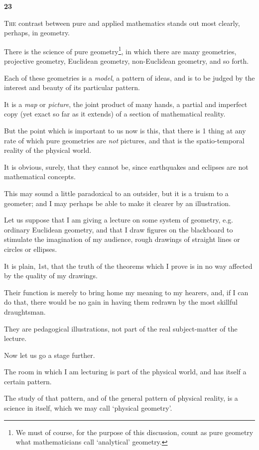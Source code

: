 \documentclass{article}
\numberwithin{equation}{section}
\begin{document}
\begin{center}
    \large\textbf{23}
\end{center}
\textsc{The} contrast between pure and applied mathematics stands out most clearly, perhaps, in geometry.

There is the science of pure geometry\footnote{We must of course, for the purpose of this discussion, count as pure geometry what mathematicians call `analytical' geometry.}, in which there are many geometries, projective geometry, Euclidean geometry, non-Euclidean geometry, and so forth.

Each of these geometries is a \textit{model}, a pattern of ideas, and is to be judged by the interest and beauty of its particular pattern.

It is a \textit{map} or \textit{picture}, the joint product of many hands, a partial and imperfect copy (yet exact so far as it extends) of a section of mathematical reality.

But the point which is important to us now is this, that there is 1 thing at any rate of which pure geometries are \textit{not} pictures, and that is the spatio-temporal reality of the physical world.

It is obvious, surely, that they cannot be, since earthquakes and eclipses are not mathematical concepts.

%
This may sound a little paradoxical to an outsider, but it is a truism to a geometer; and I may perhaps be able to make it clearer by an illustration.

Let us suppose that I am giving a lecture on some system of geometry, e.g. ordinary Euclidean geometry, and that I draw figures on the blackboard to stimulate the imagination of my audience, rough drawings of straight lines or circles or ellipses.

It is plain, 1st, that the truth of the theorems which I prove is in no way affected by the quality of my drawings.

Their function is merely to bring home my meaning to my hearers, and, if I can do that, there would be no gain in having them redrawn by the most skillful draughtsman.

They are pedagogical illustrations, not part of the real subject-matter of the lecture.

%
Now let us go a stage further.

The room in which I am lecturing is part of the physical world, and has itself a certain pattern.

The study of that pattern, and of the general pattern of physical reality, is a science in itself, which we may call `physical geometry'.
\end{document}
